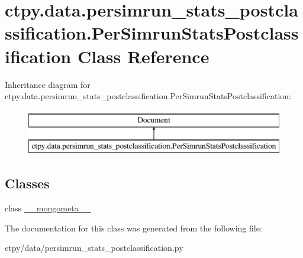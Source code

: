 \hypertarget{classctpy_1_1data_1_1persimrun__stats__postclassification_1_1_per_simrun_stats_postclassification}{\section{ctpy.\-data.\-persimrun\-\_\-stats\-\_\-postclassification.\-Per\-Simrun\-Stats\-Postclassification Class Reference}
\label{classctpy_1_1data_1_1persimrun__stats__postclassification_1_1_per_simrun_stats_postclassification}
}
Inheritance diagram for ctpy.\-data.\-persimrun\-\_\-stats\-\_\-postclassification.\-Per\-Simrun\-Stats\-Postclassification\-:\begin{figure}[H]
\begin{center}
\leavevmode
\includegraphics[height=2.000000cm]{classctpy_1_1data_1_1persimrun__stats__postclassification_1_1_per_simrun_stats_postclassification}
\end{center}
\end{figure}
\subsection*{Classes}
\begin{DoxyCompactItemize}
\item 
class \hyperlink{classctpy_1_1data_1_1persimrun__stats__postclassification_1_1_per_simrun_stats_postclassification_1_1____mongometa____}{\-\_\-\-\_\-mongometa\-\_\-\-\_\-}
\end{DoxyCompactItemize}


The documentation for this class was generated from the following file\-:\begin{DoxyCompactItemize}
\item 
ctpy/data/persimrun\-\_\-stats\-\_\-postclassification.\-py\end{DoxyCompactItemize}

